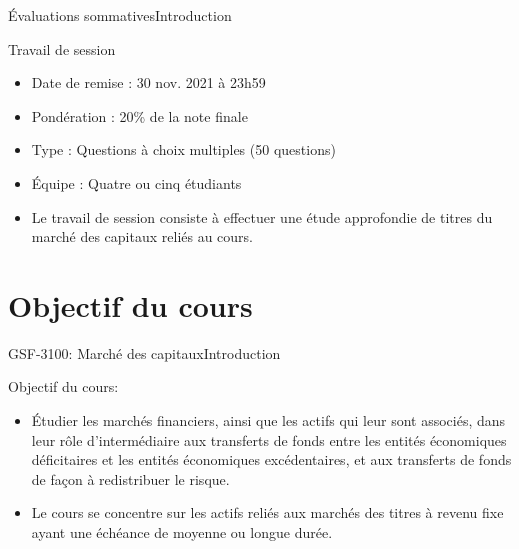 \documentclass{beamer}
\begin{document}
\begin{frame}{Évaluations sommatives}{Introduction}
  \begin{block}{Travail de session}
\begin{itemize}
\item Date de remise : 30 nov. 2021 à 23h59
\item Pondération : 20\% de la note finale 
\item Type : Questions à choix multiples (50 questions)
\item Équipe : Quatre ou cinq étudiants
\item Le travail de session consiste à effectuer une étude approfondie de titres du marché des capitaux reliés au cours.
\end{itemize}
\end{block}
\end{frame}


\section{Objectif du cours}
\begin{frame}{GSF-3100: Marché des capitaux}{Introduction}
  \begin{block}{Objectif du cours:}
\begin{itemize}
\item Étudier les marchés financiers, ainsi que les actifs qui leur sont associés, dans leur rôle d’intermédiaire aux transferts de fonds entre les entités économiques déficitaires et les entités économiques excédentaires, et aux transferts de fonds de façon à redistribuer le risque. 
\item  Le cours se concentre sur les actifs reliés aux marchés des titres à revenu fixe ayant une échéance de moyenne ou longue durée.
\end{itemize}
  \end{block}
\end{frame}
\end{document}
